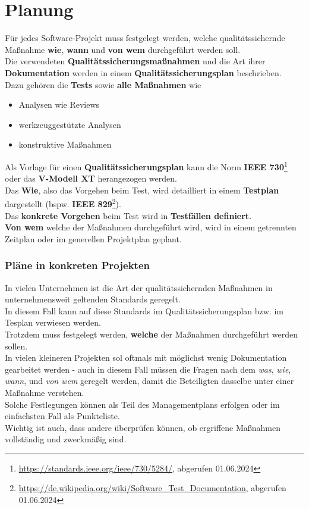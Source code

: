 \section{Planung}
Für jedes Software-Projekt muss festgelegt werden, welche qualitätssichernde Maßnahme \textbf{wie}, \textbf{wann} und \textbf{von wem} durchgeführt werden soll.\\

\noindent
Die verwendeten \textbf{Qualitätssicherungsmaßnahmen} und die Art ihrer \textbf{Dokumentation} werden in einem \textbf{Qualitätssicherungsplan} beschrieben.\\
Dazu gehören die \textbf{Tests} sowie \textbf{alle Maßnahmen} wie

\begin{itemize}
    \item Analysen wie Reviews
    \item werkzeuggestützte Analysen
    \item konstruktive Maßnahmen
\end{itemize}

\noindent
Als Vorlage für einen \textbf{Qualitätssicherungsplan} kann die  Norm \textbf{IEEE 730}\footnote{
\url{https://standards.ieee.org/ieee/730/5284/}, abgerufen 01.06.2024
} oder das \textbf{V-Modell XT} herangezogen werden.\\
Das \textbf{Wie}, also das Vorgehen beim Test, wird detailliert in einem \textbf{Testplan} dargestellt (bspw. \textbf{IEEE 829}\footnote{
\url{https://de.wikipedia.org/wiki/Software_Test_Documentation}, abgerufen 01.06.2024
}).\\
Das \textbf{konkrete Vorgehen} beim Test wird in \textbf{Testfällen definiert}.\\
\textbf{Von wem} welche der Maßnahmen durchgeführt wird, wird in einem getrennten Zeitplan oder im generellen Projektplan  geplant.

\subsubsection*{Pläne in konkreten Projekten}
In vielen Unternehmen ist die Art der qualitätssichernden Maßnahmen in unternehmensweit geltenden Standards geregelt.\\
In diesem Fall kann auf diese Standards im Qualitätssicherungsplan bzw. im Tesplan verwiesen werden.\\
Trotzdem muss festgelegt werden, \textbf{welche} der Maßnahmen durchgeführt werden sollen.\\
In vielen kleineren Projekten sol oftmals mit möglichst wenig Dokumentation gearbeitet werden - auch in diesem Fall müssen die Fragen nach dem \textit{was}, \textit{wie}, \textit{wann}, und \textit{von wem} geregelt werden, damit die Beteiligten dasselbe unter einer Maßnahme verstehen.\\
Solche Festlegungen können als Teil des Managementplans erfolgen oder im einfachsten Fall als Punkteliste.\\
Wichtig ist auch, dass andere überprüfen können, ob ergriffene Maßnahmen vollständig und zweckmäßig sind.